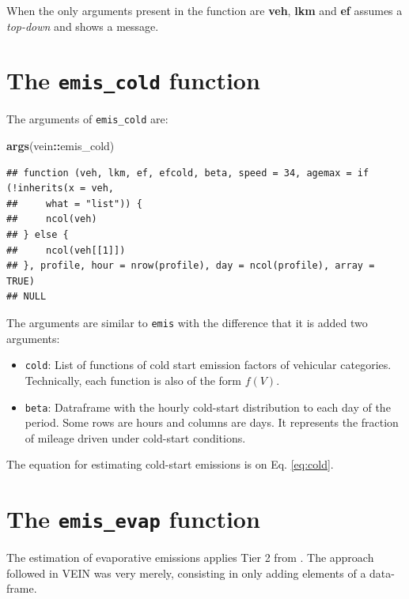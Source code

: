 \documentclass[12pt,graybox,envcountchap,sectrefs]{krantz}
\makeatletter
\newenvironment{Shaded}{\begin{snugshade}}{\end{snugshade}}
\newcommand{\KeywordTok}[1]{\textcolor[rgb]{0.13,0.29,0.53}{\textbf{#1}}}
\newcommand{\OperatorTok}[1]{\textcolor[rgb]{0.81,0.36,0.00}{\textbf{#1}}}
\newcommand{\NormalTok}[1]{#1}
\providecommand{\tightlist}{%
  \setlength{\itemsep}{0pt}\setlength{\parskip}{0pt}}
\newenvironment{kframe}{%
\medskip{}
\setlength{\fboxsep}{.8em}
 \def\at@end@of@kframe{}%
 \ifinner\ifhmode%
  \def\at@end@of@kframe{\end{minipage}}%
  \begin{minipage}{\columnwidth}%
 \fi\fi%
 \def\FrameCommand##1{\hskip\@totalleftmargin \hskip-\fboxsep
 \colorbox{shadecolor}{##1}\hskip-\fboxsep
     \hskip-\linewidth \hskip-\@totalleftmargin \hskip\columnwidth}%
 \MakeFramed {\advance\hsize-\width
   \@totalleftmargin\z@ \linewidth\hsize
   \@setminipage}}%
 {\par\unskip\endMakeFramed%
 \at@end@of@kframe}
\renewenvironment{Shaded}{\begin{kframe}}{\end{kframe}}
\theoremstyle{definition}
\theoremstyle{definition}
\theoremstyle{definition}
\theoremstyle{remark}
\makeatother
\begin{document}
When the only arguments present in the function are \textbf{veh},
\textbf{lkm} and \textbf{ef} assumes a \emph{top-down} and shows a
message.

\section{\texorpdfstring{The \texttt{emis\_cold}
function}{The emis\_cold function}}\label{the-emis_cold-function}

The arguments of \texttt{emis\_cold} are:

\begin{Shaded}
\begin{Highlighting}[]
\KeywordTok{args}\NormalTok{(vein}\OperatorTok{::}\NormalTok{emis_cold)}
\end{Highlighting}
\end{Shaded}

\begin{verbatim}
## function (veh, lkm, ef, efcold, beta, speed = 34, agemax = if (!inherits(x = veh, 
##     what = "list")) {
##     ncol(veh)
## } else {
##     ncol(veh[[1]])
## }, profile, hour = nrow(profile), day = ncol(profile), array = TRUE) 
## NULL
\end{verbatim}

The arguments are similar to \texttt{emis} with the difference that it
is added two arguments:

\begin{itemize}
\tightlist
\item
  \texttt{cold}: List of functions of cold start emission factors of
  vehicular categories. Technically, each function is also of the form
  \(f(V)\).
\item
  \texttt{beta}: Datraframe with the hourly cold-start distribution to
  each day of the period. Some rows are hours and columns are days. It
  represents the fraction of mileage driven under cold-start conditions.
\end{itemize}

The equation for estimating cold-start emissions is on Eq.
\eqref{eq:cold}.

\section{\texorpdfstring{The \texttt{emis\_evap}
function}{The emis\_evap function}}\label{the-emis_evap-function}

The estimation of evaporative emissions applies Tier 2 from
\citet{MelliosNtziachristos2016}. The approach followed in VEIN was very
merely, consisting in only adding elements of a data-frame.
\end{document}

